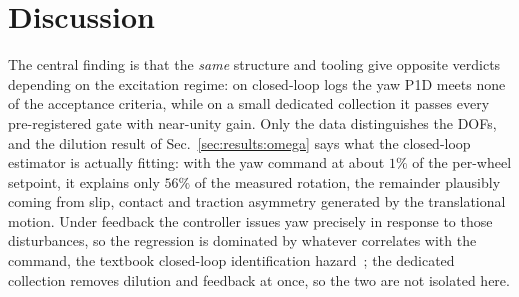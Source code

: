\section{Discussion}
\label{sec:discussion}

The central finding is that the \emph{same} structure and tooling give opposite verdicts depending on the excitation regime: on closed-loop logs the yaw P1D meets none of the acceptance criteria, while on a small dedicated collection it passes every pre-registered gate with near-unity gain. Only the data distinguishes the DOFs, and the dilution result of Sec.~\ref{sec:results:omega} says what the closed-loop estimator is actually fitting: with the yaw command at about $1\%$ of the per-wheel setpoint, it explains only $56\%$ of the measured rotation, the remainder plausibly coming from slip, contact and traction asymmetry generated by the translational motion. Under feedback the controller issues yaw precisely in response to those disturbances, so the regression is dominated by whatever correlates with the command, the textbook closed-loop identification hazard~\cite{gustavsson1977identification,vandenhof1998closedloop,forssell1999closedloop}; the dedicated collection removes dilution and feedback at once, so the two are not isolated here.

